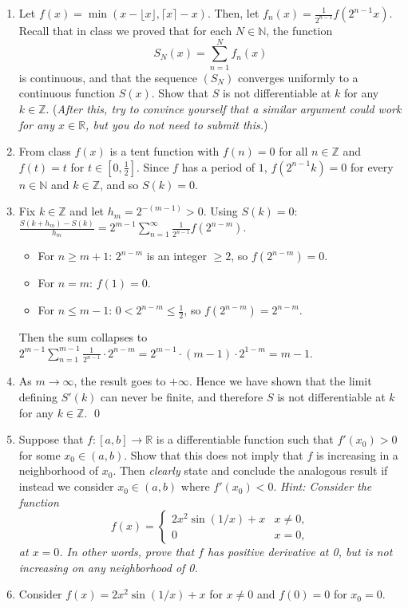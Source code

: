 \documentclass[12pt]{article}
\newcommand{\R}{\mathbb{R}}
\newcommand{\N}{\mathbb{N}}
\newcommand{\Z}{\mathbb{Z}}
\begin{document}
\begin{enumerate}
\item Let $f(x) = \min(x - \lfloor x \rfloor, \lceil x \rceil - x)$. Then, let $f_n(x) = \frac{1}{2^{n-1}}f(2^{n-1}x)$. Recall that in class we proved that for each $N \in \mathbb N$, the function \[S_N(x) = \sum_{n = 1}^N f_n(x)\] is continuous, and that the sequence $(S_N)$ converges uniformly to a continuous function $S(x)$. Show that $S$ is not differentiable at $k$ for any $k \in \mathbb Z$. (\textit{After this, try to convince yourself that a similar argument could work for any $x \in \mathbb R$, but you do not need to submit this.})
\item[] From class $f(x)$ is a tent function with $f(n) = 0$ for all $n \in \Z$ and $f(t) = t$ for $t \in [0, \frac{1}{2}]$. Since $f$ has a period of $1$, $f(2^{n-1}k) = 0$ for every $n \in \N$ and $k \in \Z$, and so $S(k) = 0$.
 
\item[] Fix $k \in \Z$ and let $h_m = 2^{-(m-1)} > 0$. Using $S(k) = 0$:
$\frac{S(k + h_m) - S(k)}{h_m} = 2^{m-1} \sum_{n=1}^{\infty} \frac{1}{2^{n-1}} f\!\left(2^{n-m}\right)$.
\begin{itemize}
  \item[$\circ$] For $n \ge m+1$: $2^{n-m}$ is an integer $\ge 2$, so $f(2^{n-m}) = 0$.
  \item[$\circ$] For $n = m$: $f(1) = 0$.
  \item[$\circ$] For $n \le m-1$: $0 < 2^{n-m} \le \tfrac{1}{2}$, so $f(2^{n-m}) = 2^{n-m}$.
\end{itemize}
Then the sum collapses to $2^{m-1} \sum_{n=1}^{m-1} \frac{1}{2^{n-1}} \cdot 2^{n-m} = 2^{m-1} \cdot (m-1) \cdot 2^{1-m} = m - 1.$
 
\item[] As $m \to \infty$, the result goes to $+\infty$. Hence we have shown that the limit defining $S'(k)$ can never be finite, and therefore $S$ is not differentiable at $k$ for any $k\in \Z$. \qed

\item Suppose that $f:[a,b] \to \R$ is a differentiable function such that $f'(x_0) > 0$ for some $x_0 \in (a,b)$. Show that this does not imply that $f$ is increasing in a neighborhood of $x_0$. Then \textit{clearly} state and conclude the analogous result if instead we consider $x_0 \in (a,b)$ where $f'(x_0) < 0$.  \textit{Hint: Consider the function} \[f(x) = \begin{cases} 2x^2 \sin(1/x) + x & x \neq 0, \\ 0 & x = 0,\end{cases}\]
\textit{at $x = 0$. In other words, prove that $f$ has positive derivative at 0, but is not increasing on any neighborhood of 0.}
\item[] Consider $f(x) = 2x^2 \sin(1/x) + x$ for $x \neq 0$ and $f(0) = 0$ for $x_0 = 0$.
 

\end{enumerate}
\end{document}
